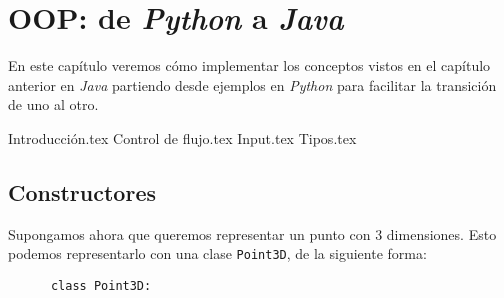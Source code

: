 \chapter{OOP: de \textit{Python} a \textit{Java}}
  En este capítulo veremos cómo implementar los conceptos vistos en el capítulo anterior 
  en \textit{Java} partiendo desde ejemplos en \textit{Python} para facilitar la 
  transición de uno al otro.

  {Introducción.tex}
  {Control de flujo.tex}
  {Input.tex}
  {Tipos.tex}

  \section{Constructores}
    Supongamos ahora que queremos representar un punto con 3 dimensiones.
    Esto podemos representarlo con una clase \texttt{Point3D}, de la siguiente forma:

    \begin{verbatim}
      class Point3D:
        
    \end{verbatim}
%
